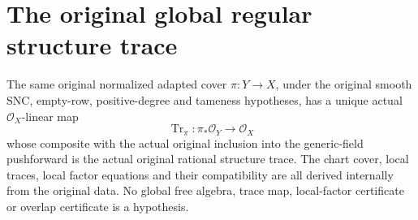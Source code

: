 \section{The original global regular structure trace}

\begin{theorem}
\label{thm:kn-structure-trace-global-regular-factor}
\leanok
The same original normalized adapted cover $\pi:Y\to X$, under the
original smooth SNC, empty-row, positive-degree and tameness hypotheses,
has a unique actual $\mathcal O_X$-linear map
\[
 \operatorname{Tr}_{\pi}:\pi_*\mathcal O_Y\longrightarrow\mathcal O_X
\]
whose composite with the actual original inclusion into the generic-field
pushforward is the actual original rational structure trace. The chart
cover, local traces, local factor equations and their compatibility are
all derived internally from the original data. No global free algebra,
trace map, local-factor certificate or overlap certificate is a hypothesis.
\end{theorem}
